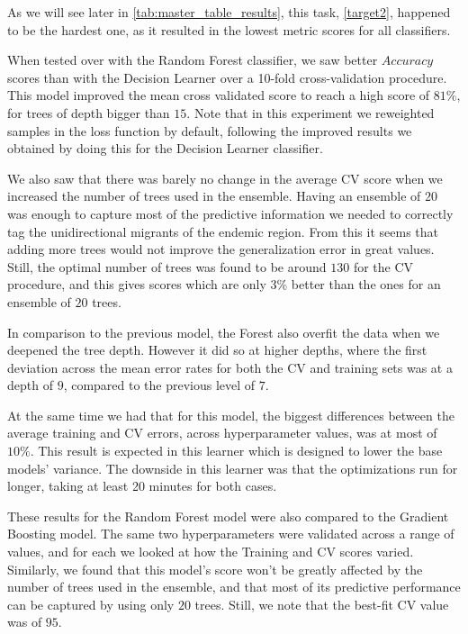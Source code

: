As we will see later in \cref{tab:master_table_results}, this task, \cref{target2}, happened to be the hardest one, as it resulted in the lowest metric scores for all classifiers.

When tested over with the Random Forest classifier, we saw better $Accuracy$ scores than with the Decision Learner over a 10-fold cross-validation procedure.
This model improved the mean cross validated score to reach a high score of $81\%$, for trees of depth bigger than $15$.
Note that in this experiment we reweighted samples in the loss function by default, following the improved results we obtained by doing this for the Decision Learner classifier.

We also saw that there was barely no change in the average CV score when we increased the number of trees used in the ensemble.
Having an ensemble of $20$ was enough to capture most of the predictive information we needed to correctly tag the unidirectional migrants of the endemic region.
From this it seems that adding more trees would not improve the generalization error in great values.
Still, the optimal number of trees was found to be around $130$ for the CV procedure, and this gives scores which are only $3\%$ better than the ones for an ensemble of $20$ trees.

In comparison to the previous model, the Forest also overfit the data when we deepened the tree depth.
However it did so at higher depths, where the first deviation across the mean error rates for both the CV and training sets was at a depth of $9$, compared to the previous level of $7$.

At the same time we had that for this model, the biggest differences between the average training and CV errors, across hyperparameter values, was at most of $10\%$.
This result is expected in this learner which is designed to lower the base models' variance.
The downside in this learner was that the optimizations run for longer, taking at least 20 minutes for both cases.

These results for the Random Forest model were also compared to the Gradient Boosting model.
The same two hyperparameters were validated across a range of values, and for each we looked at how the Training and CV scores varied.
Similarly, we found that this model's score won't be greatly affected by the number of trees used in the ensemble, and that most of its predictive performance can be captured by using only $20$ trees.
Still, we note that the best-fit CV value was of $95$.

